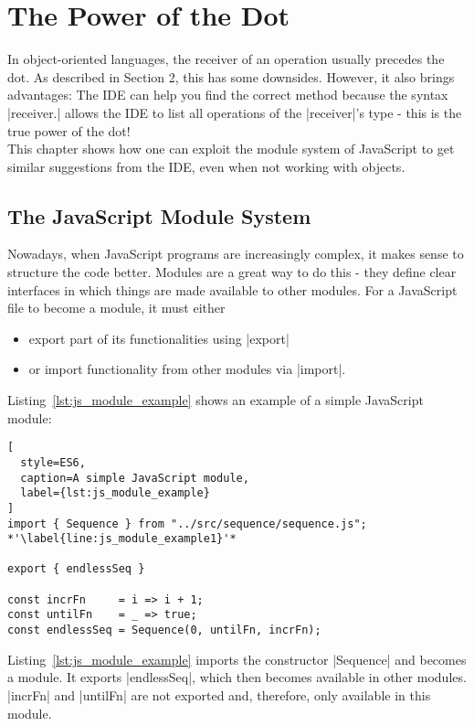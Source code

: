 \section{The Power of the Dot} %
\label{sec:The Power of the Dot}
In object-oriented languages, the receiver of an operation usually precedes the
dot. As described in Section 2, this has some downsides. However, it also
brings advantages: The IDE can help you find the correct method because the
syntax |receiver.| allows the IDE to list all operations of the |receiver|'s
type - this is the true power of the dot! \cite[Chapter "The Power of the
Dot"]{frege_goodness} \\ This chapter shows how one can exploit the module
system of JavaScript to get similar suggestions from the IDE, even when not
working with objects.

\subsection{The JavaScript Module System} %
\label{sub:The JavaScript Module System}

Nowadays, when JavaScript programs are increasingly complex, it makes sense to
structure the code better. Modules are a great way to do this - they define
clear interfaces in which things are made available to other modules.
For a JavaScript file to become a module, it must either
\begin{itemize}
  \item export part of its functionalities using |export|
  \item or import functionality from other modules via |import|.
\end{itemize}

Listing~\ref{lst:js_module_example} shows an example of a simple JavaScript
module:
\begin{lstlisting}[
  style=ES6,
  caption=A simple JavaScript module,
  label={lst:js_module_example}
]
import { Sequence } from "../src/sequence/sequence.js"; *'\label{line:js_module_example1}'*

export { endlessSeq }

const incrFn     = i => i + 1;
const untilFn    = _ => true;
const endlessSeq = Sequence(0, untilFn, incrFn);
\end{lstlisting}

Listing~\ref{lst:js_module_example} imports the constructor |Sequence| and
becomes a module. It exports |endlessSeq|, which then becomes available in
other modules. |incrFn| and |untilFn| are not exported and, therefore, only
available in this module.

